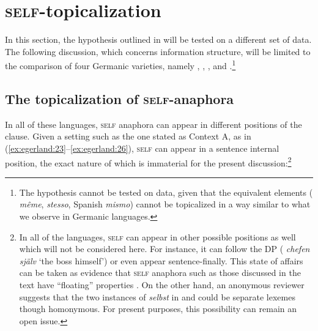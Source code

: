 \documentclass[output=paper]{LSP/langsci}
\begin{document}
\section{\textsc{self}-topicalization}\label{sec:egerland:4}

In this section, the hypothesis outlined in  will be tested on a different set of data. The following discussion, which concerns information structure, will be limited to the comparison of four Germanic varieties, namely , , , and .\footnote{The hypothesis cannot be tested on  data, given that the equivalent elements ( \textit{même},  \textit{stesso}, Spanish \textit{mismo}) cannot be topicalized in a way similar to what we observe in Germanic languages.}

\subsection{The topicalization of \textsc{self}-anaphora}\label{sec:egerland:4.1}

In all of these languages, \textsc{self} anaphora can appear in different positions of the clause. Given a setting such as the one stated as Context A, as in (\ref{ex:egerland:23}--\ref{ex:egerland:26}), \textsc{self} can appear in a sentence internal position, the exact nature of which is immaterial for the present discussion:\footnote{In all of the languages, \textsc{self} can appear in other possible positions as well which will not be considered here. For instance, it can follow the DP ( \textit{chefen själv} ‘the boss himself’) or even appear sentence-finally. This state of affairs can be taken as evidence that \textsc{self} anaphora such as those discussed in the text have “floating” properties \citep{Kayne1975,Sportiche1988}. On the other hand, an anonymous reviewer suggests that the two instances of  \textit{selbst} in  and  could be separate lexemes though homonymous. For present purposes, this possibility can remain an open issue.}
\end{document}
